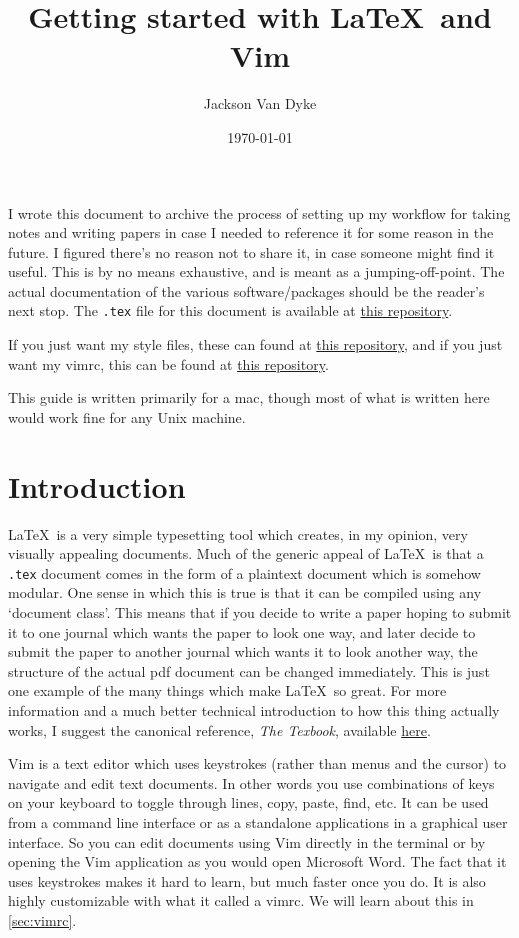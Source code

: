 \documentclass{amsart}
\begin{document}
\title{Getting started with \LaTeX\ and Vim}
\author{Jackson Van Dyke}
\date{\today}
\maketitle
\tableofcontents

I wrote this document to archive the process of setting up my workflow for taking notes
and writing papers in case I needed to reference it for some reason in the future. 
I figured there's no reason not to share it, in case someone might find it useful.
This is by no means exhaustive, and is meant as a jumping-off-point. The actual
documentation of the various software/packages should be the reader's next stop.
The \texttt{.tex} file for this document is available at 
\href{https://github.com/jacksontvd/tex/tree/master/getting_started}{this repository}.

If you just want my style files, these can found at 
\href{https://github.com/jacksontvd/tex}{this repository}, and if you just want my vimrc,
this can be found at \href{https://github.com/jacksontvd/vim}{this repository}.

This guide is written primarily for a mac, though most of what is written here would work
fine for any Unix machine.

\section{Introduction}

\LaTeX\ is a very simple typesetting tool which creates, in my opinion, very visually
appealing documents. Much of the generic appeal of \LaTeX\ is that a \texttt{.tex} document
comes in the form of a plaintext document which is somehow modular.
One sense in which this is true is that it can be compiled using any `document class'.
This means that if you decide to write a paper hoping to submit it to one journal which
wants the paper to look one way, and later decide to submit the paper to another journal
which wants it to look another way, the structure of the actual pdf document can be
changed immediately. This is just one example of the many things which make \LaTeX\ so
great. For more information and a much better technical introduction to how this thing
actually works, I suggest the canonical reference, \textit{The Texbook}, available
\href{http://www.ctex.org/documents/shredder/src/texbook.pdf}{here}.

Vim is a text editor which uses keystrokes (rather than menus and the cursor) to navigate and edit text documents. 
In other words you use combinations of keys on your keyboard to toggle through lines,
copy, paste, find, etc.
It can be used from a command line interface or as a standalone applications in 
a graphical user interface. So you can edit documents using Vim directly in the terminal
or by opening the Vim application as you would open Microsoft Word. 
The fact that it uses keystrokes makes it hard to learn, but much faster once you do. 
It is also highly customizable with what it called a vimrc. We will learn about this
in \cref{sec:vimrc}.
\end{document}
